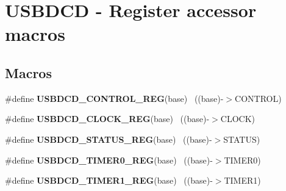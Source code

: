 \hypertarget{group___u_s_b_d_c_d___register___accessor___macros}{}\section{U\+S\+B\+D\+C\+D -\/ Register accessor macros}
\label{group___u_s_b_d_c_d___register___accessor___macros}
\subsection*{Macros}
\begin{DoxyCompactItemize}
\item 
\hypertarget{group___u_s_b_d_c_d___register___accessor___macros_ga257d5151df6a12b6afd43a0ab18bd985}{}\#define {\bfseries U\+S\+B\+D\+C\+D\+\_\+\+C\+O\+N\+T\+R\+O\+L\+\_\+\+R\+E\+G}(base)                              ~((base)-\/$>$C\+O\+N\+T\+R\+O\+L)\label{group___u_s_b_d_c_d___register___accessor___macros_ga257d5151df6a12b6afd43a0ab18bd985}

\item 
\hypertarget{group___u_s_b_d_c_d___register___accessor___macros_ga8bba9961332354ffeb00ecf680537695}{}\#define {\bfseries U\+S\+B\+D\+C\+D\+\_\+\+C\+L\+O\+C\+K\+\_\+\+R\+E\+G}(base)                                  ~((base)-\/$>$C\+L\+O\+C\+K)\label{group___u_s_b_d_c_d___register___accessor___macros_ga8bba9961332354ffeb00ecf680537695}

\item 
\hypertarget{group___u_s_b_d_c_d___register___accessor___macros_ga99a4ce6cc19f531916ab02aea07e14a9}{}\#define {\bfseries U\+S\+B\+D\+C\+D\+\_\+\+S\+T\+A\+T\+U\+S\+\_\+\+R\+E\+G}(base)                                ~((base)-\/$>$S\+T\+A\+T\+U\+S)\label{group___u_s_b_d_c_d___register___accessor___macros_ga99a4ce6cc19f531916ab02aea07e14a9}

\item 
\hypertarget{group___u_s_b_d_c_d___register___accessor___macros_ga5eab5fbaf9280881c33dc0ed61dfbb80}{}\#define {\bfseries U\+S\+B\+D\+C\+D\+\_\+\+T\+I\+M\+E\+R0\+\_\+\+R\+E\+G}(base)                                ~((base)-\/$>$T\+I\+M\+E\+R0)\label{group___u_s_b_d_c_d___register___accessor___macros_ga5eab5fbaf9280881c33dc0ed61dfbb80}

\item 
\hypertarget{group___u_s_b_d_c_d___register___accessor___macros_ga88e54db7c70cc1d168f792ffd054ceea}{}\#define {\bfseries U\+S\+B\+D\+C\+D\+\_\+\+T\+I\+M\+E\+R1\+\_\+\+R\+E\+G}(base)                                ~((base)-\/$>$T\+I\+M\+E\+R1)\label{group___u_s_b_d_c_d___register___accessor___macros_ga88e54db7c70cc1d168f792ffd054ceea}


\end{DoxyCompactItemize}
